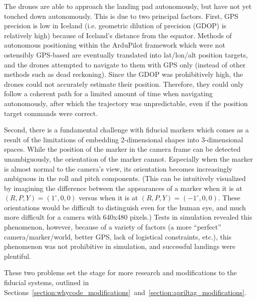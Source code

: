 The drones are able to approach the landing pad autonomously,
but have not yet touched down autonomously.
This is due to two principal factors.
First, GPS precision is low in Iceland (i.e. geometric dilution of precision (GDOP) is relatively high)
because of Iceland's distance from the equator.
Methods of autonomous positioning within the ArduPilot framework which were not ostensibly GPS-based
are eventually translated into lat/lon/alt position targets,
and the drones attempted to navigate to them with GPS only (instead of other methods such as dead reckoning).
Since the GDOP was prohibitively high, the drones could not accurately estimate their position.
Therefore, they could only follow a coherent path for a limited amount of time when navigating autonomously,
after which the trajectory was unpredictable, even if the position target commands were correct.

Second, there is a fundamental challenge with fiducial markers
which comes as a result of the limitations of embedding 2-dimensional shapes into 3-dimensional spaces.
While the position of the marker in the camera frame can be detected unambiguously,
the orientation of the marker cannot.
Especially when the marker is almost normal to the camera's view,
its orientation becomes increasingly ambiguous in the roll and pitch components.
(This can be intuitively visualized by imagining the difference between the appearances of a marker
when it is at $(R,P,Y)=(1^{\circ}, 0, 0)$ versus when it is at $(R,P,Y)=(-1^{\circ}, 0, 0)$.
These orientations would be difficult to distinguish even for the human eye, and much more difficult
for a camera with 640x480 pixels.)
Tests in simulation revealed this phenomenon, however, because of a variety of factors
(a more ``perfect'' camera/marker/world, better GPS, lack of logistical constraints, etc.),
this phenomenon was not prohibitive in simulation, and successful landings were plentiful.

These two problems set the stage for more research and modifications to the fiducial systems,
outlined in Sections~\ref{section:whycode_modifications}~and~\ref{section:apriltag_modifications}.